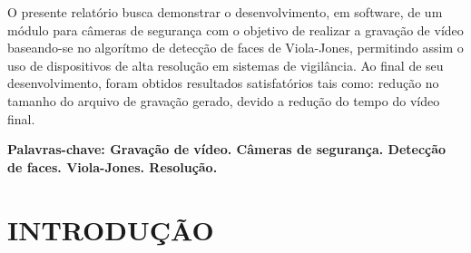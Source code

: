 \documentclass[a4paper,12pt]{article}
\begin{document}
\vspace{3cm}

\begin{flushleft}

\hspace{4ex}O presente relatório busca demonstrar o desenvolvimento, em software, de um módulo para câmeras de segurança com o objetivo de realizar a gravação de vídeo baseando-se no algorítmo de detecção de faces de Viola-Jones, permitindo assim o uso de dispositivos de alta resolução em sistemas de vigilância. Ao final de seu desenvolvimento, foram obtidos resultados satisfatórios tais como: redução no tamanho do arquivo de gravação gerado, devido a redução do tempo do vídeo final.\\

\end{flushleft}

\vspace{1.5cm}

\textbf{Palavras-chave: Gravação de vídeo. Câmeras de segurança. Detecção de faces. Viola-Jones. Resolução.}

\newpage





\thispagestyle{empty}

\begin{center}
\listoffigures
\end{center}

\newpage


\thispagestyle{empty}

\begin{center}
\tableofcontents
\end{center}

\newpage


\thispagestyle{main}

\section{INTRODUÇÃO}
\end{document}
